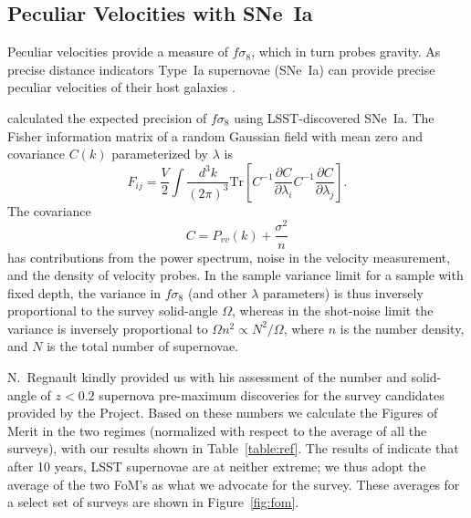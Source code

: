 \documentclass{aastex62}   	%
\begin{document}
\subsection{Peculiar Velocities with SNe~Ia}
Peculiar velocities provide a measure of $f\sigma_8$, which in turn probes gravity.  As precise distance indicators Type~Ia supernovae (SNe~Ia)
can provide precise peculiar velocities of their host galaxies \citep{2006PhRvD..73l3526H,2011ApJ...741...67D}.

\citet{2017ApJ...847..128H} calculated the  expected precision of $f\sigma_8$ using LSST-discovered SNe~Ia.
The Fisher information matrix of a random Gaussian field with mean zero and covariance $C(k)$ parameterized by $\lambda$ is
\begin{equation}
F_{ij} = \frac{V}{2}\int \frac{d^3k}{(2\pi)^3} \text{Tr}\left[ C^{-1} \frac{\partial C}{\partial \lambda_i} C^{-1}
\frac{\partial C}{\partial \lambda_j} \right].
\end{equation}
The covariance
\begin{equation}
C = P_{vv}(k) + \frac{\sigma^2}{n}
\end{equation}
has contributions from the power spectrum, noise in the velocity measurement, and the density of velocity probes.
In the sample variance limit for a sample with fixed depth, the variance in $f\sigma_8$ (and other $\lambda$ parameters)
is thus inversely proportional to the survey solid-angle $\Omega$, whereas
in the shot-noise limit the variance is inversely proportional to $\Omega n^2 \propto N^2/\Omega$, where $n$ is the number density,
and $N$ is the total number of supernovae.  

N.~Regnault kindly provided us with his assessment of the number and solid-angle of $z<0.2$ supernova pre-maximum discoveries 
for the survey candidates provided by the Project.  Based on these numbers we calculate the Figures of Merit in the two regimes 
(normalized with respect to the average of all the surveys),
with our results shown in 
Table~\ref{table:ref}.  The results of \citet{2017ApJ...847..128H}  indicate that after 10 years,
LSST supernovae are at neither extreme; we thus adopt the average of the two FoM's as what we advocate for the survey.
These averages for a select set of surveys are shown in Figure~\ref{fig:fom}.
\end{document}
